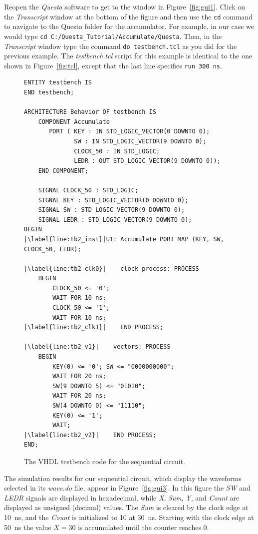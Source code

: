 \documentclass[11pt, twoside, pdftex]{article}
\begin{document}
\noindent
Reopen the {\it Questa} software to get to the window in Figure~\ref{fig:gui1}.
Click on the {\it Transcript} window at the bottom of the figure and then use the
\texttt{cd} command to navigate to the Questa folder for the accumulator. For 
example, in our case we would type 
\texttt{cd C:/Questa\_Tutorial/Accumulate/Questa}. 
Then, in the {\it Transcript} window type the command \texttt{do testbench.tcl} as you
did for the previous example. The {\it testbench.tcl} script for this example is identical
to the one shown in Figure~\ref{fig:tcl}, except that the last line specifies
\texttt{run 300 ns}.

\lstset{language=VHDL,numbers=left,escapechar=|}
\begin{figure}[h!]
\begin{center}
\begin{minipage}[t]{15 cm}
\begin{lstlisting}[name=testbench2]
ENTITY testbench IS
END testbench;
 
ARCHITECTURE Behavior OF testbench IS
    COMPONENT Accumulate
       PORT ( KEY : IN STD_LOGIC_VECTOR(0 DOWNTO 0);
              SW : IN STD_LOGIC_VECTOR(9 DOWNTO 0);  
              CLOCK_50 : IN STD_LOGIC;
              LEDR : OUT STD_LOGIC_VECTOR(9 DOWNTO 0));
    END COMPONENT;

    SIGNAL CLOCK_50 : STD_LOGIC;
    SIGNAL KEY : STD_LOGIC_VECTOR(0 DOWNTO 0);
    SIGNAL SW : STD_LOGIC_VECTOR(9 DOWNTO 0);
    SIGNAL LEDR : STD_LOGIC_VECTOR(9 DOWNTO 0);
BEGIN
|\label{line:tb2_inst}|U1: Accumulate PORT MAP (KEY, SW, CLOCK_50, LEDR);

|\label{line:tb2_clk0}|    clock_process: PROCESS
    BEGIN
        CLOCK_50 <= '0';
        WAIT FOR 10 ns;
        CLOCK_50 <= '1';
        WAIT FOR 10 ns;
|\label{line:tb2_clk1}|    END PROCESS;

|\label{line:tb2_v1}|    vectors: PROCESS
    BEGIN
        KEY(0) <= '0'; SW <= "0000000000"; 
        WAIT FOR 20 ns;
        SW(9 DOWNTO 5) <= "01010";
        WAIT FOR 20 ns;
        SW(4 DOWNTO 0) <= "11110"; 
        KEY(0) <= '1';
        WAIT;
|\label{line:tb2_v2}|    END PROCESS;
END;
\end{lstlisting}
\end{minipage}
\caption{The VHDL testbench code for the sequential circuit.}
\label{fig:tb2}
\end{center}
\end{figure}

\noindent
The simulation results for our sequential circuit, which display the waveforms selected in its
{\it wave.do} file, appear in Figure~\ref{fig:gui3}. In this figure the {\it SW} and 
{\it LEDR} signals are displayed in hexadecimal, while {\it X}, {\it Sum}, {\it Y}, and {\it
Count} are displayed as unsigned (decimal) values. The {\it Sum} is cleared by the 
clock edge at 10~ns, and the {\it Count} is initialized to 10 at 30~ns. Starting with the clock
edge at 50~ns the value $X=30$ is accumulated until the counter reaches 0.
\end{document}
